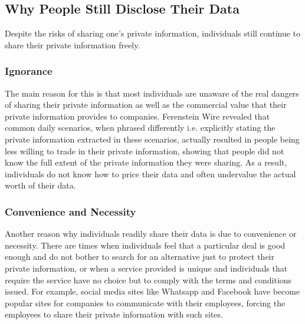 \documentclass{icmmcm}
\begin{document}
\subsection{Why People Still Disclose Their Data} 
Despite the risks of sharing one's private information, individuals still continue to share their private information freely.  

\subsubsection*{Ignorance}
The main reason for this is that most individuals are unaware of the real dangers of sharing their private information as well as the commercial value that their private information provides to companies. 
Ferenstein Wire \citep{ferenstein_disclose} revealed that common daily scenarios, when phrased differently i.e. explicitly stating the private information extracted in these scenarios, actually resulted in people being less willing to trade in their private information, showing that people did not know the full extent of the private information they were sharing. As a result, individuals do not know how to price their data and often undervalue the actual worth of their data.

\subsubsection*{Convenience and Necessity}
Another reason why individuals readily share their data is due to convenience or necessity. There are times when individuals feel that a particular deal is good enough and do not bother to search for an alternative just to protect their private information, or when a service provided is unique and individuals that require the service have no choice but to comply with the terms and conditions issued. For example, social media sites like Whatsapp and Facebook have become popular sites for companies to communicate with their employees, forcing the employees to share their private information with such sites.

\end{document}
